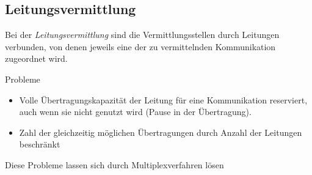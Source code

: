 \documentclass[12pt]{report}
\begin{document}
\subsection{Leitungsvermittlung}
\begin{defbox}
  Bei der \textit{Leitungsvermittlung} sind die Vermittlungsstellen durch Leitungen verbunden,
  von denen jeweils eine der zu vermittelnden Kommunikation zugeordnet wird.
  
  Probleme
  \begin{itemize}
    \item Volle Übertragungskapazität der Leitung für eine Kommunikation reserviert,
          auch wenn sie nicht genutzt wird (Pause in der Übertragung).
          
    \item Zahl der gleichzeitig möglichen Übertragungen durch Anzahl der Leitungen beschränkt
  \end{itemize}
  
  Diese Probleme lassen sich durch Multiplexverfahren lösen
\end{defbox}
\end{document}
